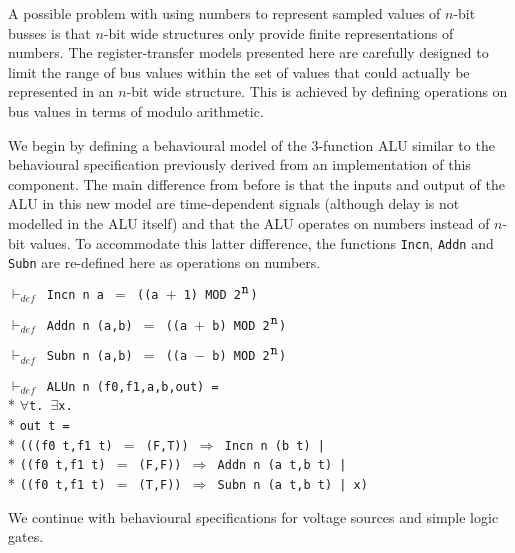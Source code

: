 \begin{normalsize}
A possible problem with using numbers to represent sampled values
of \mbox{$n$-bit} busses is that \mbox{$n$-bit} wide structures only provide
finite representations of numbers.
The register-transfer models presented here
are carefully designed to limit the range of bus values
within the set of values that could actually be represented
in an \mbox{$n$-bit} wide structure.
This is achieved by defining operations on bus values in terms
of modulo arithmetic.

We begin by defining a behavioural model of the 3-function
ALU similar to the behavioural specification previously derived
from an implementation of this component.
The main difference from before
is that the inputs and output of the
ALU in this new model are time-dependent signals (although
delay is not modelled in the ALU itself) and that the ALU
operates on numbers instead of \mbox{$n$-bit} values.
To accommodate this latter difference,
the functions \verb"Incn", \verb"Addn" and \verb"Subn" are
re-defined here as operations on numbers.

$\vdash_{def}$\verb" Incn n a "$=$\verb" ((a "$+$\verb" 1) MOD 2"$^{\verb"n"}$\verb")"

$\vdash_{def}$\verb" Addn n (a,b) "$=$\verb" ((a "$+$\verb" b) MOD 2"$^{\verb"n"}$\verb")"

$\vdash_{def}$\verb" Subn n (a,b) "$=$\verb" ((a "$-$\verb" b) MOD 2"$^{\verb"n"}$\verb")"

\hspace*{\fill}
\begin{minipage}{17cm}
$\vdash_{def}$\verb" ALUn n (f0,f1,a,b,out) ="\\*
$\forall$\verb"t. "$\exists$\verb"x."\\*
\verb"out t ="\\*
\verb"(((f0 t,f1 t) "$=$\verb" (F,T)) "$\Rightarrow$\verb" Incn n (b t) |"\\*
\verb"((f0 t,f1 t) "$=$\verb" (F,F)) "$\Rightarrow$\verb" Addn n (a t,b t) |"\\*
\verb"((f0 t,f1 t) "$=$\verb" (T,F)) "$\Rightarrow$\verb" Subn n (a t,b t) | x)"
\end{minipage}
\hspace*{\fill}

We continue with behavioural specifications for voltage sources
and simple logic gates.


\end{normalsize}
